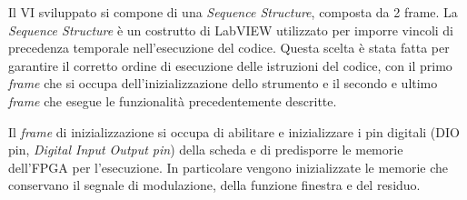 Il VI sviluppato si compone di una \textit{Sequence Structure}, composta da 2 frame. La \textit{Sequence Structure} è un costrutto di LabVIEW utilizzato per imporre vincoli di precedenza temporale nell'esecuzione del codice. Questa scelta è stata fatta per garantire il corretto ordine di esecuzione delle istruzioni del codice, con il primo \textit{frame} che si occupa dell'inizializzazione dello strumento e il secondo e ultimo \textit{frame} che esegue le funzionalità precedentemente descritte.

Il \textit{frame} di inizializzazione si occupa di abilitare e inizializzare i pin digitali (DIO pin, \textit{Digital Input Output pin}) della scheda e di predisporre le memorie dell'FPGA per l'esecuzione. In particolare vengono inizializzate le memorie che conservano il segnale di modulazione, della funzione finestra e del residuo.

